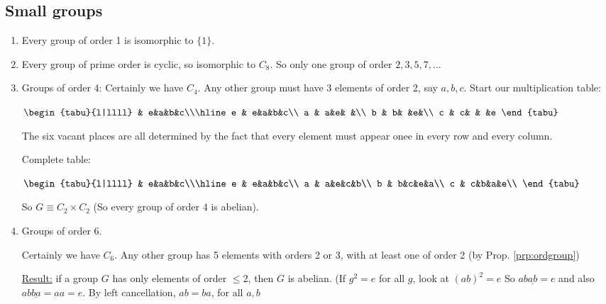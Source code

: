 \documentclass{article}
\theoremstyle{definition} \newtheorem*{definition}{Definition}
\begin{document}
\subsection{Small groups} \begin{enumerate} \item Every group of order 1 is
    isomorphic to $\{1\}$.  \item Every group of prime order is cyclic, so
      isomorphic to $C_8$. So only one group of order $2,3,5,7,\ldots$

\item Groups of order 4: Certainly we have $C_4$. Any other group must have 3
  elements of order 2, say $a,b,c$. Start our multiplication table:

  \begin{table}[h] \centering $\begin{tabu}{l|llll} & e&a&b&c\\\hline e &
      e&a&b&c\\ a & a&e& &\\ b & b& &e&\\ c & c& & &e \end{tabu}$
    \label{tab:startedtable} \end{table}

The six vacant places are all determined by the fact that every element must
appear onee in every row and every column.

Complete table: \begin{table}[h] \centering $\begin{tabu}{l|llll} &
    e&a&b&c\\\hline e & e&a&b&c\\ a & a&e&c&b\\ b & b&c&e&a\\ c & c&b&a&e\\
  \end{tabu}$ \label{tab:completesimpletable} \end{table}

So $G \equiv C_2 \times C_2$ (So every group of order 4 is abelian).

\item Groups of order 6.

  Certainly we have $C_6$. Any other group has 5 elements with orders 2 or 3,
  with at least one of order 2 (by Prop. \ref{prp:ordgroup})

  \underline{Result:} if a group $G$ has only elements of order $\leq 2$, then
  $G$ is abelian. (If $g^2 = e$ for all $g$, look at $(ab)^2 = e$ So
  $ab\underline{ab}=e$ and also $ab\underline{ba}=aa=e$. By left cancellation,
  $ab=ba$, for all $a,b$


\end{enumerate}
\end{document}
